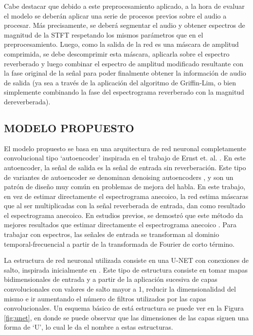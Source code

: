 Cabe destacar que debido a este preprocesamiento aplicado, a la hora de evaluar el modelo se deberán aplicar una serie de procesos previos sobre el audio a procesar. Más precisamente, se deberá segmentar el audio y obtener espectros de magnitud de la STFT respetando los mismos parámetros que en el preprocesamiento. Luego, como la salida de la red es una máscara de amplitud comprimida, se debe descomprimir esta máscara, aplicarla sobre el espectro reverberado y luego combinar el espectro de amplitud modificado resultante con la fase original de la señal para poder finalmente obtener la información de audio de salida (ya sea a través de la aplicación del algoritmo de Griffin-Lim, o bien simplemente combinando la fase del espectrograma reverberado con la magnitud dereverberada).


\subsection[Modelo propuesto]{MODELO PROPUESTO}

El modelo propuesto se basa en una arquitectura de red neuronal completamente convolucional tipo `autoencoder' inspirada en el trabajo de Ernst et. al. \cite{FCN}. En este autoencoder, la señal de salida es la señal de entrada sin reverberación. Este tipo de variantes de autoencoder se denominan denoising autoencoders \cite{DAE}, y son un patrón de diseño muy común en problemas de mejora del habla. En este trabajo, en vez de estimar directamente el espectrograma anecoico, la red estima máscaras que al ser multiplicadas con la señal reverberada de entrada, dan como resultado el espectrograma anecoico. En estudios previos, se demostró que este método da mejores resultados que estimar directamente el espectrograma anecoico \cite{mask_vs_map}. Para trabajar con espectros, las señales de entrada se transforman al dominio temporal-frecuencial a partir de la transformada de Fourier de corto término.
 
La estructura de red neuronal utilizada consiste en una U-NET con conexiones de salto, inspirada inicialmente en \cite{FCN}. Este tipo de estructura consiste en tomar mapas bidimensionales de entrada y a partir de la aplicación sucesiva de capas convolucionales con valores de salto mayor a 1, reducir la dimensionalidad del mismo e ir aumentando el número de filtros utilizados por las capas convolucionales. Un esquema básico de está estructura se puede ver en la Figura \ref{fig:unet}, en donde se puede observar que las dimensiones de las capas siguen una forma de `U', lo cual le da el nombre a estas estructuras.

